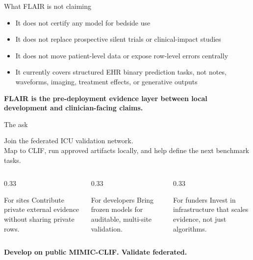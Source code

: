 \documentclass[aspectratio=169,11pt,xcolor={table}]{beamer}
\begin{document}
\begin{frame}{What FLAIR is not claiming}
  \begin{itemize}
    \item It does not certify any model for bedside use
    \item It does not replace prospective silent trials or clinical-impact studies
    \item It does not move patient-level data or expose row-level errors centrally
    \item It currently covers structured EHR binary prediction tasks, not notes, waveforms, imaging, treatment effects, or generative outputs
  \end{itemize}
  \vfill
  \begin{center}\color{flairblue}\textbf{FLAIR is the pre-deployment evidence layer between local development and clinician-facing claims.}\end{center}
\end{frame}

\begin{frame}{The ask}
  \vfill
  \begin{center}
    {\Large Join the federated ICU validation network.}\\[1.0em]
    {\large Map to CLIF, run approved artifacts locally, and help define the next benchmark tasks.}
  \end{center}
  \vfill
  \begin{columns}[T]
  \begin{column}{0.33\textwidth}
    \begin{block}{For sites}
      Contribute private external evidence without sharing private rows.
    \end{block}
  \end{column}
  \begin{column}{0.33\textwidth}
    \begin{block}{For developers}
      Bring frozen models for auditable, multi-site validation.
    \end{block}
  \end{column}
  \begin{column}{0.33\textwidth}
    \begin{block}{For funders}
      Invest in infrastructure that scales evidence, not just algorithms.
    \end{block}
  \end{column}
  \end{columns}
  \vfill
  \begin{center}\Large\color{flairblue}\textbf{Develop on public MIMIC-CLIF. Validate federated.}\end{center}
\end{frame}
\end{document}
